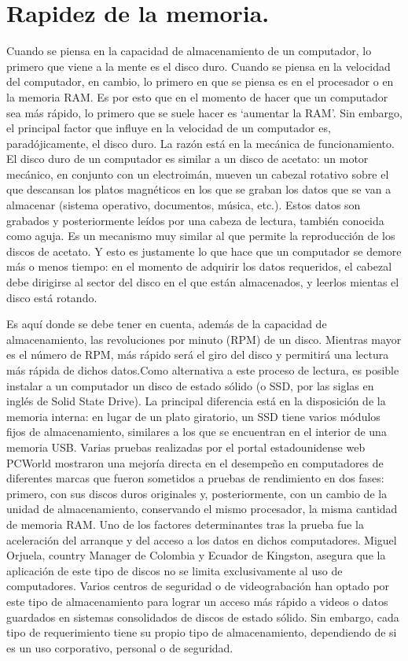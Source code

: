 \documentclass{article}
\begin{document}
\section{Rapidez de la memoria.}\label{contenido} 
Cuando se piensa en la capacidad de almacenamiento de un computador, lo primero que viene a la mente es el disco duro. Cuando se piensa en la velocidad del computador, en cambio, lo primero en que se piensa es en el procesador o en la memoria RAM. Es por esto que en el momento de hacer que un computador sea más rápido, lo primero que se suele hacer es ‘aumentar la RAM’. Sin embargo, el principal factor que influye en la velocidad de un computador es, paradójicamente, el disco duro. La razón está en la mecánica de funcionamiento. El disco duro de un computador es similar a un disco de acetato: un motor mecánico, en conjunto con un electroimán, mueven un cabezal rotativo sobre el que descansan los platos magnéticos en los que se graban los datos que se van a almacenar (sistema operativo, documentos, música, etc.). Estos datos son grabados y posteriormente leídos por una cabeza de lectura, también conocida como aguja. Es un mecanismo muy similar al que permite la reproducción de los discos de acetato. Y esto es justamente lo que hace que un computador se demore más o menos tiempo: en el momento de adquirir los datos requeridos, el cabezal debe dirigirse al sector del disco en el que están almacenados, y leerlos mientas el disco está rotando.

Es aquí donde se debe tener en cuenta, además de la capacidad de almacenamiento, las revoluciones por minuto (RPM) de un disco. Mientras mayor es el número de RPM, más rápido será el giro del disco y permitirá una lectura más rápida de dichos datos.Como alternativa a este proceso de lectura, es posible instalar a un computador un disco de estado sólido (o SSD, por las siglas en inglés de Solid State Drive). La principal diferencia está en la disposición de la memoria interna: en lugar de un plato giratorio, un SSD tiene varios módulos fijos de almacenamiento, similares a los que se encuentran en el interior de una memoria USB. Varias pruebas realizadas por el portal estadounidense web PCWorld mostraron una mejoría directa en el desempeño en computadores de diferentes marcas que fueron sometidos a pruebas de rendimiento en dos fases: primero, con sus discos duros originales y, posteriormente, con un cambio de la unidad de almacenamiento, conservando el mismo procesador, la misma cantidad de memoria RAM. Uno de los factores determinantes tras la prueba fue la aceleración del arranque y del acceso a los datos en dichos computadores. Miguel Orjuela, country Manager de Colombia y Ecuador de Kingston, asegura que la aplicación de este tipo de discos no se limita exclusivamente al uso de computadores. Varios centros de seguridad o de videograbación han optado por este tipo de almacenamiento para lograr un acceso más rápido a videos o datos guardados en sistemas consolidados de discos de estado sólido. Sin embargo, cada tipo de requerimiento tiene su propio tipo de almacenamiento, dependiendo de si es un uso corporativo, personal o de seguridad.
\cite{DISCO}
\end{document}
